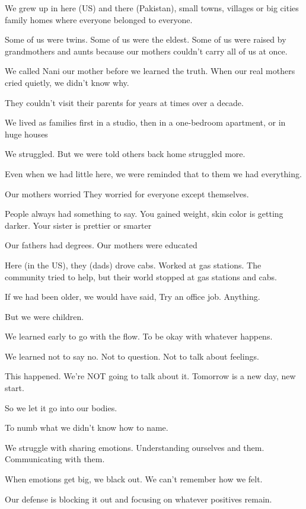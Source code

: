 \begin{FoundPoem}
We grew up in here (US) and there (Pakistan),
 small towns, villages or big cities
 family homes where everyone belonged to everyone.
 
Some of us were twins.
Some of us were the eldest.
Some of us were raised by grandmothers and aunts
because our mothers couldn’t carry all of us at once.

We called Nani our mother
before we learned the truth.
When our real mothers cried quietly,
we didn’t know why.

They couldn’t visit their parents
 for years at times over a decade.
 
We lived as families 
 first in a studio,
 then in a one-bedroom apartment, or in huge houses
 
We struggled.
But we were told others back home struggled more.

Even when we had little here,
we were reminded that to them
we had everything.

Our mothers worried
They worried for everyone except themselves.

People always had something to say.
You gained weight, skin color is getting darker.
Your sister is prettier or smarter

Our fathers had degrees.
Our mothers were educated

Here (in the US), they (dads) drove cabs.
Worked at gas stations.
The community tried to help,
but their world stopped at gas stations and cabs.

If we had been older,
 we would have said,
 Try an office job.
 Anything.
 
But we were children.

We learned early to go with the flow.
To be okay with whatever happens.

We learned not to say no.
Not to question.
Not to talk about feelings.

This happened.
 We’re NOT going to talk about it.
 Tomorrow is a new day, new start.

So we let it go
 into our bodies.
 
To numb what we didn’t know how to name.

We struggle with sharing emotions.
 Understanding ourselves and them.
 Communicating with them.
 
When emotions get big,
 we black out.
 We can’t remember how we felt.
 
Our defense is blocking it out
and focusing on whatever positives remain.


\end{FoundPoem}
